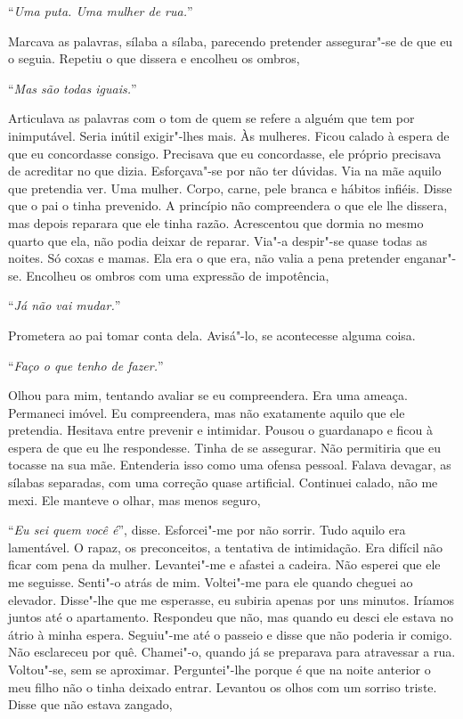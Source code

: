 ``\emph{Uma puta. Uma mulher de rua.}''

Marcava as palavras, sílaba a sílaba, parecendo pretender assegurar"-se
de que eu o seguia. Repetiu o que dissera e encolheu os ombros,

``\emph{Mas são todas iguais.}''

Articulava as palavras com o tom de quem se refere a alguém que tem por
inimputável. Seria inútil exigir"-lhes mais. Às mulheres. Ficou calado à
espera de que eu concordasse consigo. Precisava que eu concordasse, ele
próprio precisava de acreditar no que dizia. Esforçava"-se por não ter
dúvidas. Via na mãe aquilo que pretendia ver. Uma mulher. Corpo, carne,
pele branca e hábitos infiéis. Disse que o pai o tinha prevenido. A
princípio não compreendera o que ele lhe dissera, mas depois reparara
que ele tinha razão. Acrescentou que dormia no mesmo quarto que ela, não
podia deixar de reparar. Via"-a despir"-se quase todas as noites. Só
coxas e mamas. Ela era o que era, não valia a pena pretender
enganar"-se. Encolheu os ombros com uma expressão de impotência,

``\emph{Já não vai mudar.}''

Prometera ao pai tomar conta dela. Avisá"-lo, se acontecesse alguma
coisa.

``\emph{Faço o que tenho de fazer.}''

Olhou para mim, tentando avaliar se eu compreendera. Era uma ameaça.
Permaneci imóvel. Eu compreendera, mas não exatamente aquilo que ele
pretendia. Hesitava entre prevenir e intimidar. Pousou o guardanapo e
ficou à espera de que eu lhe respondesse. Tinha de se assegurar. Não
permitiria que eu tocasse na sua mãe. Entenderia isso como uma ofensa
pessoal. Falava devagar, as sílabas separadas, com uma correção quase
artificial. Continuei calado, não me mexi. Ele manteve o olhar, mas
menos seguro,

``\emph{Eu sei quem você é}'',
disse. Esforcei"-me por não sorrir. Tudo aquilo era lamentável. O rapaz,
os preconceitos, a tentativa de intimidação. Era difícil não ficar com
pena da mulher. Levantei"-me e afastei a cadeira. Não esperei que ele me
seguisse. Senti"-o atrás de mim. Voltei"-me para ele quando cheguei ao
elevador. Disse"-lhe que me esperasse, eu subiria apenas por uns
minutos. Iríamos juntos até o apartamento. Respondeu que não, mas
quando eu desci ele estava no átrio à minha espera. Seguiu"-me até o
passeio e disse que não poderia ir comigo. Não esclareceu por quê.
Chamei"-o, quando já se preparava para atravessar a rua. Voltou"-se, sem
se aproximar. Perguntei"-lhe porque é que na noite anterior o meu filho
não o tinha deixado entrar. Levantou os olhos com um sorriso triste.
Disse que não estava zangado,


